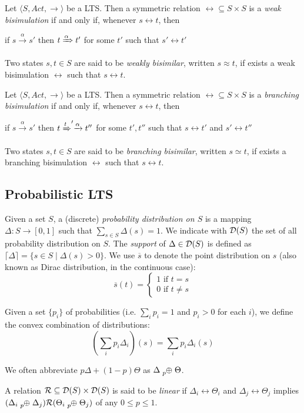 Let $\langle S , Act, \rightarrow \rangle$ be a LTS. Then a symmetric relation $\rel \subseteq S \times S$ is a \textit{weak bisimulation} if and only if, whenever $s \rel t$, then 
\begin{center}
if $s \xrightarrow{\alpha} s'$ then $t \xRightarrow{\alpha} t'$ for some $t'$ such that $s' \rel t'$
\end{center}
Two states $s, t \in S$ are said to be \textit{weakly bisimilar}, written $s \approx t$, if exists a weak bisimulation $\rel$ such that $s \rel t$. 


Let $\langle S , Act, \rightarrow \rangle$ be a LTS. Then a symmetric relation $\rel \subseteq S \times S$ is a \textit{branching bisimulation} if and only if, whenever $s \rel t$, then 
\begin{center}
if $s \xrightarrow{\alpha} s'$ then $t \xRightarrow t' \xrightarrow{\alpha} t''$ for some $t', t''$ such that $s \rel t'$ and $s' \rel t''$
\end{center}
Two states $s, t \in S$ are said to be \textit{branching bisimilar}, written $s \simeq t$, if exists a branching bisimulation $\rel$ such that $s \rel t$.

\subsection{Probabilistic LTS}

Given a set $S$, a (discrete) \textit{probability distribution on $S$} is a mapping $\Delta: S \rightarrow [0, 1]$ such that $\sum_{s\in S} \Delta(s) = 1$. We indicate with $\mathcal{D}(S)$ the set of all probability distribution on $S$.
The \textit{support} of $\Delta \in \mathcal{D}(S)$ is defined as $\lceil\Delta\rceil = \{s \in S \mid \Delta(s) > 0\}$. We use $\overline{s}$ to denote the point distribution on $s$ (also known as Dirac distribution, in the continuous case):
\[
	\overline{s}(t) = 
	\begin{cases} 1 \text{ if }t = s \\
	0 \text{ if } t\neq s
	\end{cases}
\]

Given a set $\{p_i\}$ of probabilities (i.e. $\sum_i p_i = 1$ and $p_i > 0$ for each $i$), we define the convex combination of distributions:
\[
\left(\sum_i p_i \Delta_i\right)(s) = \sum_i p_i \Delta_i(s)
\]

We often abbreviate $p \Delta + (1-p) \Theta$ as $\Delta \psum{p} \Theta$.


A relation $\mathcal{R} \subseteq \mathcal{D}(S) \times \mathcal{D}(S)$ is said to be \textit{linear} if $\Delta_i \rel \Theta_i$ and $\Delta_j \rel \Theta_j$ implies $(\Delta_i \psum{p} \Delta_j) \rel (\Theta_i \psum{p} \Theta_j)$ of any $0 \leq p \leq 1$.


